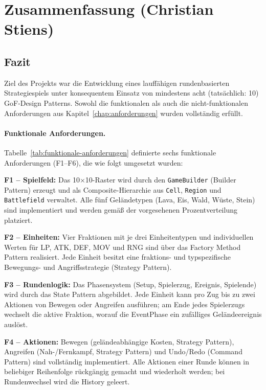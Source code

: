 \section{Zusammenfassung (Christian Stiens)}
\label{chap:zusammenfassung}

\subsection{Fazit}
\label{sec:fazit}

Ziel des Projekts war die Entwicklung eines lauffähigen rundenbasierten Strategiespiels unter konsequentem Einsatz von mindestens acht (tatsächlich: 10) GoF-Design Patterns.
Sowohl die funktionalen als auch die nicht-funktionalen Anforderungen aus Kapitel~\ref{chap:anforderungen} wurden vollständig erfüllt.

\paragraph{Funktionale Anforderungen.}
Tabelle~\ref{tab:funktionale-anforderungen} definierte sechs funktionale Anforderungen (F1--F6), die wie folgt umgesetzt wurden:

\textbf{F1 – Spielfeld:} Das 10$\times$10-Raster wird durch den \texttt{GameBuilder} (Builder Pattern) erzeugt und als Composite-Hierarchie aus \texttt{Cell}, \texttt{Region} und \texttt{Battlefield} verwaltet.
Alle fünf Geländetypen (Lava, Eis, Wald, Wüste, Stein) sind implementiert und werden gemäß der vorgesehenen Prozentverteilung platziert.

\textbf{F2 – Einheiten:} Vier Fraktionen mit je drei Einheitentypen und individuellen Werten für LP, ATK, DEF, MOV und RNG sind über das Factory Method Pattern realisiert.
Jede Einheit besitzt eine fraktions- und typspezifische Bewegungs- und Angriffsstrategie (Strategy Pattern).

\textbf{F3 – Rundenlogik:} Das Phasensystem (Setup, Spielerzug, Ereignis, Spielende) wird durch das State Pattern abgebildet.
Jede Einheit kann pro Zug bis zu zwei Aktionen von Bewegen oder Angreifen ausführen; am Ende jedes Spielerzugs wechselt die aktive Fraktion, worauf die EventPhase ein zufälliges Geländeereignis auslöst.

\textbf{F4 – Aktionen:} Bewegen (geländeabhängige Kosten, Strategy Pattern), Angreifen (Nah-/Fernkampf, Strategy Pattern) und Undo/Redo (Command Pattern) sind vollständig implementiert.
Alle Aktionen einer Runde können in beliebiger Reihenfolge rückgängig gemacht und wiederholt werden; bei Rundenwechsel wird die History geleert.

